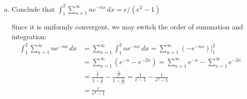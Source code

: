 \documentclass{article}
\begin{document}
\begin{itemize}
\begin{enumerate}[(a)]
			\item Conclude that $\int_1^2\sum_{n=1}^{\infty} ne^{-nx}\, dx = e/(e^2-1)$
				\begin{soln}
					Since it is uniformly convergent, we may switch the order of summation and integration:
					\begin{align*}
						\int_1^2 \sum_{n=1}^{\infty} ne^{-nx}\, dx &= \sum_{n=1}^{\infty}\int_1^2 ne^{-nx}\, dx = \sum_{n=1}^{\infty} (-e^{-nx})\big\vert_1^2 \\
						&= \sum_{n=1}^{\infty} \left( e^{-n}-e^{-2n} \right) = \sum_{n=1}^{\infty} e^{-n} - \sum_{n=1}^{\infty}e^{-2n} \\
						&= \frac{\frac{1}{e}}{1-\frac{1}{e}} - \frac{\frac{1}{e^2}}{1-\frac{1}{e^2}} = \frac{1}{e-1} - \frac{1}{e^2-1} \\
						&= \frac{e}{e^2-1}
					\end{align*}
				\end{soln}
				
		\end{enumerate}
		
\end{itemize}
\end{document}
